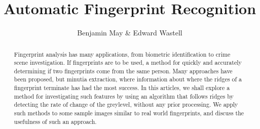 \documentclass[11pt,a4paper]{article}
\title{Automatic Fingerprint Recognition}
\author{Benjamin May \& Edward Wastell}
\date{}
\begin{document}
    \maketitle

    \begin{abstract}
      Fingerprint analysis has many applications, from biometric identification to crime scene investigation. If fingerprints are to be used, a method for quickly and accurately determining if two fingerprints come from the same person. Many approaches have been proposed, but minutia extraction, where information about where the ridges of a fingerprint terminate has had the most success. In this articles, we shall explore a method for investigating such features by using an algorithm that follows ridges by detecting the rate of change of the greylevel, without any prior processing. We apply such methods to some sample images similar to real world fingerprints, and discuss the usefulness of such an approach.
    \end{abstract}
\end{document}
